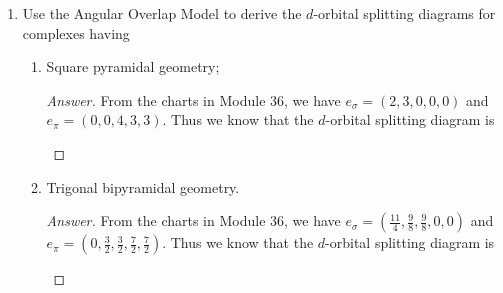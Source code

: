 \documentclass[../psets.tex]{subfiles}
\begin{document}
\begin{enumerate}[label={\Roman*)}]
\begin{enumerate}[label={\textbf{10.\arabic*}}]
\begin{proof}[Answer]
        \end{proof}
        \newpage
        \setcounter{enumii}{21}
        \item Solid  contains a (III) ion surrounded by six  ions in an octahedral geometry, all at distances of $\SI{190}{\pico\meter}$. However,  is in a distorted geometry, with  distances of 179, 191, and $\SI{209}{\pico\meter}$ (two of each). Explain.
        \begin{proof}[Answer]
            The manganese ion has unequally occupied $e_g$ orbitals whereas the chromium one does not, so the former is subject to Jahn-Teller distortion while the latter is not.
        \end{proof}
    \end{enumerate}
    \newpage
    \item Use the Angular Overlap Model to derive the $d$-orbital splitting diagrams for  complexes having
    \begin{enumerate}
        \item Square pyramidal geometry;
        \begin{proof}[Answer]
            From the charts in Module 36, we have $e_\sigma=(2,3,0,0,0)$ and $e_\pi=(0,0,4,3,3)$. Thus we know that the $d$-orbital splitting diagram is
            \begin{center}
            \end{center}
        \end{proof}
        \item Trigonal bipyramidal geometry.
        \begin{proof}[Answer]
            From the charts in Module 36, we have $e_\sigma=(\frac{11}{4},\frac{9}{8},\frac{9}{8},0,0)$ and $e_\pi=(0,\frac{3}{2},\frac{3}{2},\frac{7}{2},\frac{7}{2})$. Thus we know that the $d$-orbital splitting diagram is
            \begin{center}
\end{center}
\end{proof}
\end{enumerate}
\end{enumerate}
\end{document}
